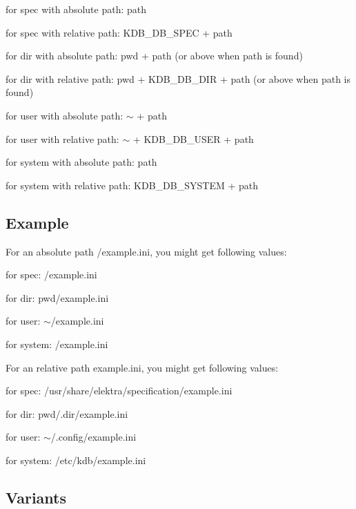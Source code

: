 \begin{DoxyItemize}
\item for spec with absolute path\+: path
\item for spec with relative path\+: K\+D\+B\+\_\+\+D\+B\+\_\+\+S\+P\+E\+C + path
\item for dir with absolute path\+: {\ttfamily pwd} + path (or above when path is found)
\item for dir with relative path\+: {\ttfamily pwd} + K\+D\+B\+\_\+\+D\+B\+\_\+\+D\+I\+R + path (or above when path is found)
\item for user with absolute path\+: $\sim$ + path
\item for user with relative path\+: $\sim$ + K\+D\+B\+\_\+\+D\+B\+\_\+\+U\+S\+E\+R + path
\item for system with absolute path\+: path
\item for system with relative path\+: K\+D\+B\+\_\+\+D\+B\+\_\+\+S\+Y\+S\+T\+E\+M + path
\end{DoxyItemize}

\subsection*{Example}

For an absolute path /example.ini, you might get following values\+:


\begin{DoxyItemize}
\item for spec\+: /example.ini
\item for dir\+: {\ttfamily pwd}/example.ini
\item for user\+: $\sim$/example.ini
\item for system\+: /example.ini
\end{DoxyItemize}

For an relative path example.\+ini, you might get following values\+:


\begin{DoxyItemize}
\item for spec\+: /usr/share/elektra/specification/example.ini
\item for dir\+: {\ttfamily pwd}/.dir/example.\+ini
\item for user\+: $\sim$/.config/example.\+ini
\item for system\+: /etc/kdb/example.ini
\end{DoxyItemize}

\subsection*{Variants}


